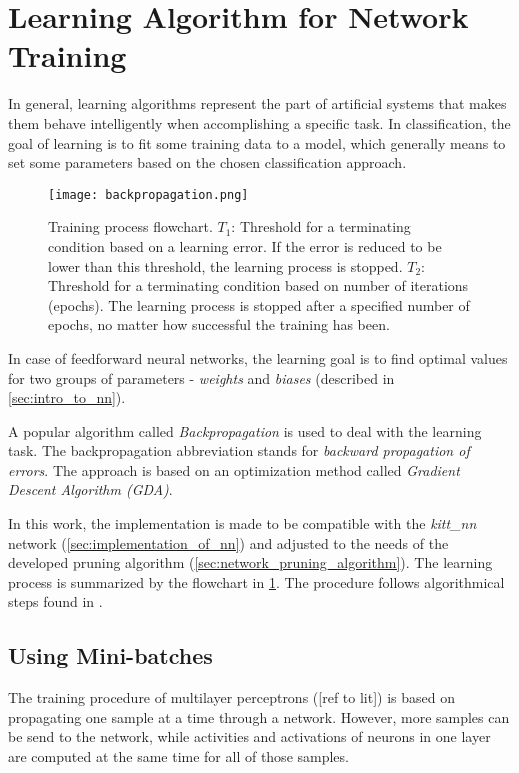 \section{Learning Algorithm for Network Training} \label{sec:learning_algorithm}
In general, learning algorithms represent the part of artificial systems that makes them behave intelligently when accomplishing a specific task. In classification, the goal of learning is to fit some training data to a model, which generally means to set some parameters based on the chosen classification approach.

\begin{figure}[H]
  \centering
  \texttt{[image: backpropagation.png]}
  \caption{Training process flowchart. $ T_1 $: Threshold for a terminating condition based on a learning error. If the error is reduced to be lower than this threshold, the learning process is stopped. $ T_2 $: Threshold for a terminating condition based on number of iterations (epochs). The learning process is stopped after a specified number of epochs, no matter how successful the training has been.}
  \label{img:backpropagation}
\end{figure}

In case of feedforward neural networks, the learning goal is to find optimal values for two groups of parameters - \textit{weights} and \textit{biases} (described in \cref{sec:intro_to_nn}).

A popular algorithm called \textit{Backpropagation} is used to deal with the learning task. The backpropagation abbreviation stands for \textit{backward propagation of errors}. The approach is based on an optimization method called \textit{Gradient Descent Algorithm (GDA)}.

In this work, the implementation is made to be compatible with the \textit{kitt\_nn} network (\cref{sec:implementation_of_nn}) and adjusted to the needs of the developed pruning algorithm (\cref{sec:network_pruning_algorithm}). The learning process is summarized by the flowchart in \cref{img:backpropagation}. The procedure follows algorithmical steps found in \citep{online:nn_demystified}.

\subsection{Using Mini-batches} \label{ssec:minibatches}
The training procedure of multilayer perceptrons ([ref to lit]) is based on propagating one sample at a time through a network. However, more samples can be send to the network, while activities and activations of neurons in one layer are computed at the same time for all of those samples.

